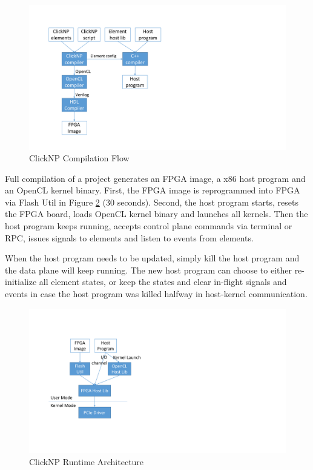 {\begin{figure}[!t]
	\centering
	\includegraphics[width=0.8\columnwidth]{image/ClickNPSoftware}
	\vspace{-0.15in}
	\caption{ClickNP Compilation Flow}
	\vspace{-0.15in}
	\label{fig:ClickNPSoftware}
\end{figure}

Full compilation of a project generates an FPGA image, a x86 host program and an OpenCL kernel binary. First, the FPGA image is reprogrammed into FPGA via Flash Util in Figure \ref{fig:CatapultFPGAArch} (30 seconds). Second, the host program starts, resets the FPGA board, loads OpenCL kernel binary and launches all kernels. Then the host program keeps running, accepts control plane commands via terminal or RPC, issues signals to elements and listen to events from elements.

When the host program needs to be updated, simply kill the host program and the data plane will keep running. The new host program can choose to either re-initialize all element states, or keep the states and clear in-flight signals and events in case the host program was killed halfway in host-kernel communication.

\begin{figure}[!t]
	\centering
	\includegraphics[width=0.8\columnwidth]{image/CatapultRuntime}
	\vspace{-0.15in}
	\caption{ClickNP Runtime Architecture}
	\vspace{-0.15in}
	\label{fig:CatapultFPGAArch}
\end{figure}
}
